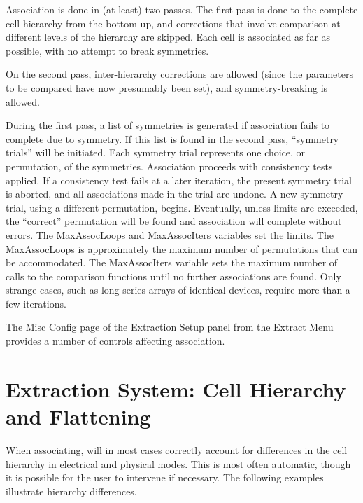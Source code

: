 Association is done in (at least) two passes.  The first pass is done
to the complete cell hierarchy from the bottom up, and corrections
that involve comparison at different levels of the hierarchy are
skipped.  Each cell is associated as far as possible, with no attempt
to break symmetries.

On the second pass, inter-hierarchy corrections are allowed (since the
parameters to be compared have now presumably been set), and
symmetry-breaking is allowed.

During the first pass, a list of symmetries is generated if
association fails to complete due to symmetry.  If this list is found
in the second pass, ``symmetry trials'' will be initiated.  Each
symmetry trial represents one choice, or permutation, of the
symmetries.  Association proceeds with consistency tests applied.  If
a consistency test fails at a later iteration, the present symmetry
trial is aborted, and all associations made in the trial are undone. 
A new symmetry trial, using a different permutation, begins. 
Eventually, unless limits are exceeded, the ``correct'' permutation
will be found and association will complete without errors.  The {\et
MaxAssocLoops} and {\et MaxAssocIters} variables set the limits.  The
{\et MaxAssocLoops} is approximately the maximum number of
permutations that can be accommodated.  The {\et MaxAssocIters}
variable sets the maximum number of calls to the comparison functions
until no further associations are found.  Only strange cases, such as
long series arrays of identical devices, require more than a few
iterations.

The {\cb Misc Config} page of the {\cb Extraction Setup} panel from
the {\cb Extract Menu} provides a number of controls affecting
association.


\section{Extraction System: Cell Hierarchy and Flattening}
\label{exthier}

When associating, {\Xic} will in most cases correctly account for
differences in the cell hierarchy in electrical and physical modes. 
This is most often automatic, though it is possible for the user to
intervene if necessary.  The following examples illustrate hierarchy
differences.

